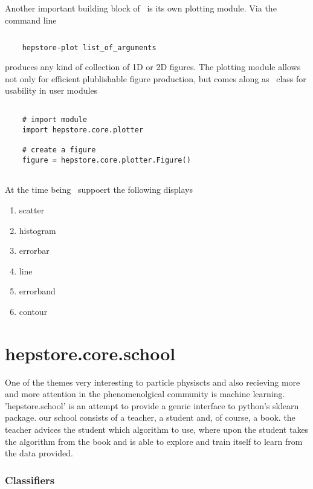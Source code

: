 Another important building block of \hepstore~is its own plotting
module. Via the command line
%
\begin{changemargin}{1.5cm}{1.5cm}
  \centering
  \begin{lstlisting}[language=Bash]
    
    hepstore-plot list_of_arguments
  \end{lstlisting}
\end{changemargin}
%
produces any kind of collection of 1D or 2D figures. The plotting
module allows not only for efficient plublishable figure production,
but comes along as \python~class for usability in user modules
%
\begin{changemargin}{1.5cm}{1.5cm}
  \centering
  \begin{lstlisting}
    
    # import module
    import hepstore.core.plotter

    # create a figure
    figure = hepstore.core.plotter.Figure()
    
  \end{lstlisting}
\end{changemargin}
%
At the time being \hepstore~suppoert the following displays
%
\begin{enumerate}
\item scatter
\item histogram
\item errorbar
\item line
\item errorband
\item contour
\end{enumerate}
%


\section{hepstore.core.school}
One of the themes very interesting to particle physiscts and also
recieving more and more attention in the phenomenolgical community is
machine learning. 'hepstore.school' is an attempt to provide a genric
interface to python's sklearn package. our school consists of a
teacher, a student and, of course, a book. the teacher advices the
student which algorithm to use, where upon the student takes the
algorithm from the book and is able to explore and train itself to
learn from the data provided.

\subsubsection{Classifiers}

